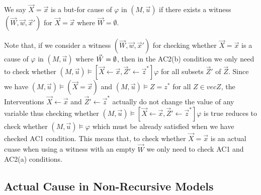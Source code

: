 \documentclass{article}
\begin{document}
\begin{definition}
    We say $\vec X = \vec x$ is a but-for cause of $\varphi$ in
    $(M,\vec u)$ if there exists a witness $(\vec W, \vec w, \vec x')$
    for $\vec X = \vec x$ where $\vec W = \emptyset $.
\end{definition}

Note that, if we consider a witness $(\vec W, \vec w, \vec x')$
for checking whether $\vec X = \vec x$ is a cause of $\varphi$
in $(M,\vec u)$ where $\vec W = \emptyset$, then in the AC2(b) condition
we only need to check whether $(M,\vec u) \vDash [\vec X \leftarrow \vec x, \vec Z' \leftarrow \vec z^*]\varphi$ for all subsets $\vec Z'$
of $\vec Z$.
Since we have $(M,\vec u) \vDash (\vec X = \vec x)$ and
$(M,\vec u) \vDash Z = z^*$ for all $Z \in vec Z$,
the Interventions $\vec X \leftarrow \vec x$ and
$\vec Z ' \leftarrow \vec z^*$ actually do not change the value of
any variable thus checking whether
$(M,\vec u) \vDash [\vec X \leftarrow \vec x, \vec Z' \leftarrow \vec z^*]\varphi$ is true
reduces to check whether $(M,\vec u) \vDash \varphi$
which must be already satisfied when we have checked AC1 condition.
This means that, to check whether $\vec X = \vec x$ is an actual cuase when using a witness with an empty $\vec W$
we only need to check AC1 and AC2(a) conditions.

\subsection{Actual Cause in Non-Recursive Models}
\end{document}
